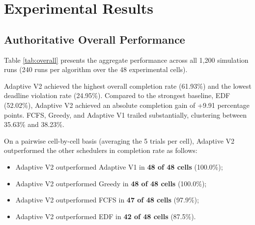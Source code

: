 \documentclass[conference]{IEEEtran}
\begin{document}
\section{Experimental Results}
\label{sec:results}

\subsection{Authoritative Overall Performance}
Table \ref{tab:overall} presents the aggregate performance across all 1,200 simulation runs (240 runs per algorithm over the 48 experimental cells).

\begin{table}[t]
\caption{Overall Scheduler Performance (Mean Across 240 Runs)}
\label{tab:overall}
\centering
{}
\end{table}

Adaptive V2 achieved the highest overall completion rate (61.93\%) and the lowest deadline violation rate (24.95\%). Compared to the strongest baseline, EDF (52.02\%), Adaptive V2 achieved an absolute completion gain of +9.91 percentage points. FCFS, Greedy, and Adaptive V1 trailed substantially, clustering between 35.63\% and 38.23\%. 

On a pairwise cell-by-cell basis (averaging the 5 trials per cell), Adaptive V2 outperformed the other schedulers in completion rate as follows:
\begin{itemize}
    \item Adaptive V2 outperformed Adaptive V1 in \textbf{48 of 48 cells} (100.0\%);
    \item Adaptive V2 outperformed Greedy in \textbf{48 of 48 cells} (100.0\%);
    \item Adaptive V2 outperformed FCFS in \textbf{47 of 48 cells} (97.9\%);
    \item Adaptive V2 outperformed EDF in \textbf{42 of 48 cells} (87.5\%).
\end{itemize}
\end{document}
